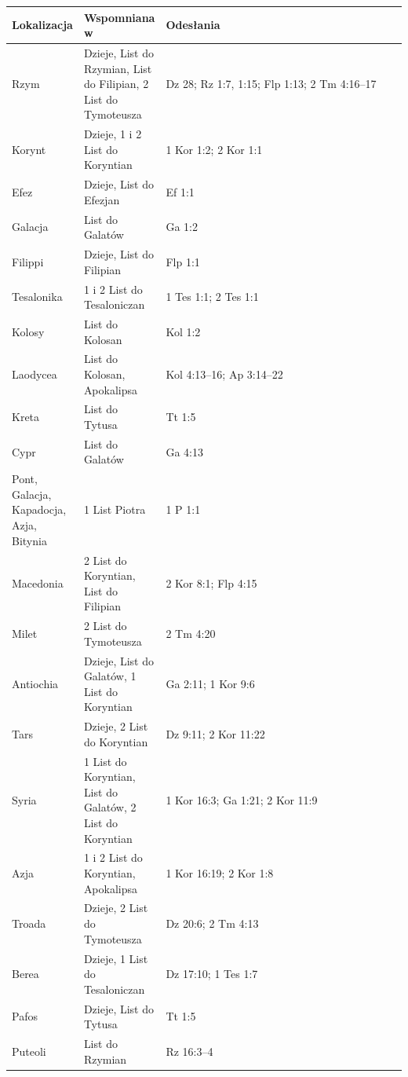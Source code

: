 \begin{longtable}[]{@{}p{0.15\linewidth} p{0.15\linewidth} p{0.7\linewidth}@{}}
    \toprule\noalign{}
    \begin{minipage}[b]{\linewidth}\raggedright
    Lokalizacja
    \end{minipage} & \begin{minipage}[b]{\linewidth}\raggedright
    Wspomniana w
    \end{minipage} & \begin{minipage}[b]{0.7\linewidth}\raggedright
    Odesłania
    \end{minipage} \\
    \midrule
    \endhead
    \bottomrule
    \endlastfoot
    Rzym & Dzieje, List do Rzymian, List do Filipian, 2 List do Tymoteusza & Dz 28; Rz 1:7, 1:15; Flp 1:13; 2 Tm 4:16–17 \\
    Korynt & Dzieje, 1 i 2 List do Koryntian & 1 Kor 1:2; 2 Kor 1:1 \\
    Efez & Dzieje, List do Efezjan & Ef 1:1 \\
    Galacja & List do Galatów & Ga 1:2 \\
    Filippi & Dzieje, List do Filipian & Flp 1:1 \\
    Tesalonika & 1 i 2 List do Tesaloniczan & 1 Tes 1:1; 2 Tes 1:1 \\
    Kolosy & List do Kolosan & Kol 1:2 \\
    Laodycea & List do Kolosan, Apokalipsa & Kol 4:13–16; Ap 3:14–22 \\
    Kreta & List do Tytusa & Tt 1:5 \\
    Cypr & List do Galatów & Ga 4:13 \\
    Pont, Galacja, Kapadocja, Azja, Bitynia & 1 List Piotra & 1 P 1:1 \\
    Macedonia & 2 List do Koryntian, List do Filipian & 2 Kor 8:1; Flp 4:15 \\
    Milet & 2 List do Tymoteusza & 2 Tm 4:20 \\
    Antiochia & Dzieje, List do Galatów, 1 List do Koryntian & Ga 2:11; 1 Kor 9:6 \\
    Tars & Dzieje, 2 List do Koryntian & Dz 9:11; 2 Kor 11:22 \\
    Syria & 1 List do Koryntian, List do Galatów, 2 List do Koryntian & 1 Kor 16:3; Ga 1:21; 2 Kor 11:9 \\
    Azja & 1 i 2 List do Koryntian, Apokalipsa & 1 Kor 16:19; 2 Kor 1:8 \\
    Troada & Dzieje, 2 List do Tymoteusza & Dz 20:6; 2 Tm 4:13 \\
    Berea & Dzieje, 1 List do Tesaloniczan & Dz 17:10; 1 Tes 1:7 \\
    Pafos & Dzieje, List do Tytusa & Tt 1:5 \\
    Puteoli & List do Rzymian & Rz 16:3–4 \\
\end{longtable}

